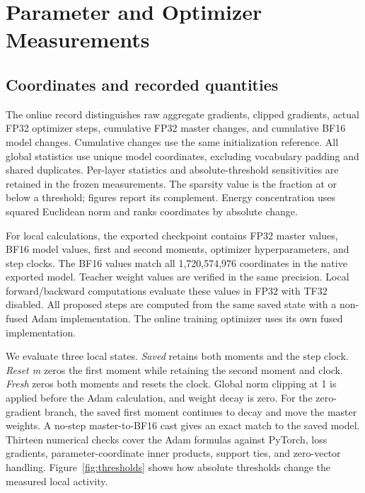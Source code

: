 \begin{table}[t]
\caption{Fixed-batch averaging comparison. Entries are raw-gradient cosines; each row uses one shared student and response bank. DR and DT share domain weights and differ only in within-domain response weighting.}
\label{tab:fixed_batch_normalization}
\centering\small

\end{table}

\section{Parameter and Optimizer Measurements}
\label{app:records}

\subsection{Coordinates and recorded quantities}

The online record distinguishes raw aggregate gradients, clipped gradients, actual FP32 optimizer steps, cumulative FP32 master changes, and cumulative BF16 model changes. Cumulative changes use the same initialization reference. All global statistics use unique model coordinates, excluding vocabulary padding and shared duplicates. Per-layer statistics and absolute-threshold sensitivities are retained in the frozen measurements. The sparsity value is the fraction at or below a threshold; figures report its complement. Energy concentration uses squared Euclidean norm and ranks coordinates by absolute change.

For local calculations, the exported checkpoint contains FP32 master values, BF16 model values, first and second moments, optimizer hyperparameters, and step clocks. The BF16 values match all 1,720,574,976 coordinates in the native exported model. Teacher weight values are verified in the same precision. Local forward/backward computations evaluate these values in FP32 with TF32 disabled. All proposed steps are computed from the same saved state with a non-fused Adam implementation. The online training optimizer uses its own fused implementation.

We evaluate three local states. \emph{Saved} retains both moments and the step clock. \emph{Reset m} zeros the first moment while retaining the second moment and clock. \emph{Fresh} zeros both moments and resets the clock. Global norm clipping at 1 is applied before the Adam calculation, and weight decay is zero. For the zero-gradient branch, the saved first moment continues to decay and move the master weights. A no-step master-to-BF16 cast gives an exact match to the saved model. Thirteen numerical checks cover the Adam formulas against PyTorch, loss gradients, parameter-coordinate inner products, support ties, and zero-vector handling. Figure~\ref{fig:thresholds} shows how absolute thresholds change the measured local activity.

